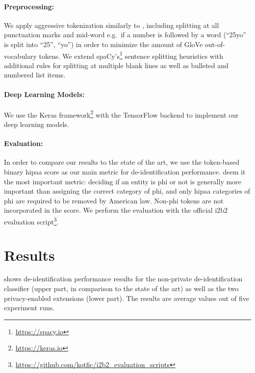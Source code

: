 \paragraph{Preprocessing:}
%
We apply aggressive tokenization similarly to \citet{liu2017identification}, including splitting at all punctuation marks and mid-word e.g.\ if a number is followed by a word (``25yo'' is split into ``25'', ``yo'') in order to minimize the amount of GloVe out-of-vocabulary tokens.
%
We extend spaCy's\footnote{\url{https://spacy.io}} sentence splitting heuristics with additional rules for splitting at multiple blank lines as well as bulleted and numbered list items.

\paragraph{Deep Learning Models:}
%
We use the Keras framework\footnote{\url{https://keras.io}} \citep{chollet2015keras} with the TensorFlow backend \citep{abadi2015tensorflow} to implement our deep learning models.
%

\paragraph{Evaluation:}
%
In order to compare our results to the state of the art, we use the token-based binary \ac{hipaa} \fone score as our main metric for de-identification performance.
%
\citet{dernoncourt2017identification} deem it the most important metric: deciding if an entity is \ac{phi} or not is generally more important than assigning the correct category of \ac{phi}, and only \ac{hipaa} categories of \ac{phi} are required to be removed by American law.
%
Non-\ac{phi} tokens are not incorporated in the \fone score.
%
We perform the evaluation with the official i2b2 evaluation script\footnote{\url{https://github.com/kotfic/i2b2\_evaluation\_scripts}}.

\section{Results}
%
 shows de-identification performance results for the non-private de-identification classifier (upper part, in comparison to the state of the art) as well as the two privacy-enabled extensions (lower part).
%
The results are average values out of five experiment runs.

